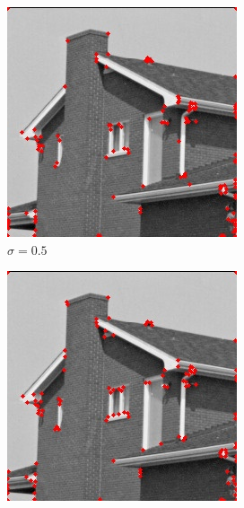 \documentclass[10pt,a4paper,twoside]{article}
\begin{document}
\begin{figure}[h]
    \begin{subfigure}{0.25\textwidth}
    \includegraphics[width=0.9\linewidth, height=0.9\linewidth]{sweep_house/house_05_005_1e-05.jpg} 
    \caption{$\sigma=0.5$}
    \end{subfigure}
    \begin{subfigure}{0.25\textwidth}
    \includegraphics[width=0.9\linewidth, height=0.9\linewidth]{sweep_house/house_10_005_1e-05.jpg} 

\end{subfigure}
\end{figure}
\end{document}
